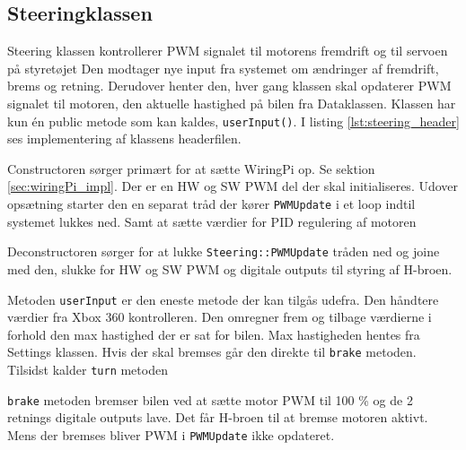 \subsection{Steeringklassen} \label{sec:steering_impl}

Steering klassen kontrollerer PWM signalet til motorens fremdrift og til servoen på styretøjet
Den modtager nye input fra systemet om ændringer af fremdrift, brems og retning. 
Derudover henter den, hver gang klassen skal opdaterer PWM signalet til motoren, den aktuelle hastighed på bilen fra Dataklassen.
Klassen har kun én public metode som kan kaldes, \texttt{userInput()}. I listing \ref{lst:steering_header} ses implementering af klassens headerfilen.



Constructoren sørger primært for at sætte WiringPi op. Se sektion \ref{sec:wiringPi_impl}. 
Der er en HW og SW PWM del der skal initialiseres. 
Udover opsætning starter den en separat tråd der kører \texttt{PWMUpdate} i et loop indtil systemet lukkes ned. 
Samt at sætte værdier for PID regulering af motoren 
\clearpage


Deconstructoren sørger for at lukke \texttt{Steering::PWMUpdate} tråden ned og joine med den, slukke for HW og SW PWM og digitale outputs til styring af H-broen.



Metoden \texttt{userInput} er den eneste metode der kan tilgås udefra. Den håndtere værdier fra Xbox 360 kontrolleren. Den omregner frem og tilbage værdierne i forhold den max hastighed der er sat for bilen. Max hastigheden hentes fra Settings klassen. Hvis der skal bremses går den direkte til \texttt{brake} metoden. Tilsidst kalder \texttt{turn} metoden

 

\texttt{brake} metoden bremser bilen ved at sætte motor PWM til 100 \% og de 2 retnings digitale outputs lave. Det får H-broen til at bremse motoren aktivt. Mens der bremses bliver PWM i \texttt{PWMUpdate} ikke opdateret.



